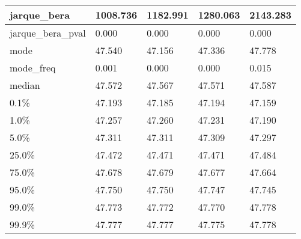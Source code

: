 \begin{table}[H]
\begin{tabular}{|l|m{10em}|m{10em}|m{10em}|m{10em}|}
\hline jarque\_bera & 1008.736 & 1182.991 & 1280.063 & 2143.283 \\
\hline jarque\_bera\_pval & 0.000 & 0.000 & 0.000 & 0.000 \\
\hline mode & 47.540 & 47.156 & 47.336 & 47.778 \\
\hline mode\_freq & 0.001 & 0.000 & 0.000 & 0.015 \\
\hline median & 47.572 & 47.567 & 47.571 & 47.587 \\
\hline 0.1\% & 47.193 & 47.185 & 47.194 & 47.159 \\
\hline 1.0\% & 47.257 & 47.260 & 47.231 & 47.190 \\
\hline 5.0\% & 47.311 & 47.311 & 47.309 & 47.297 \\
\hline 25.0\% & 47.472 & 47.471 & 47.471 & 47.484 \\
\hline 75.0\% & 47.678 & 47.679 & 47.677 & 47.664 \\
\hline 95.0\% & 47.750 & 47.750 & 47.747 & 47.745 \\
\hline 99.0\% & 47.773 & 47.772 & 47.770 & 47.778 \\
\hline 99.9\% & 47.777 & 47.777 & 47.775 & 47.778 \\
\hline
\end{tabular}
\end{table}
